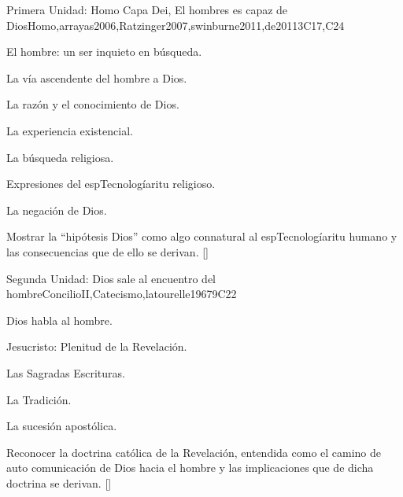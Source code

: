 \begin{syllabus}
\begin{unit}{}{Primera Unidad: Homo Capa Dei, El hombres es capaz de Dios}{Homo,arrayas2006,Ratzinger2007,swinburne2011,de2011}{3}{C17,C24}
\begin{topics}
	\item El hombre: un ser inquieto en búsqueda.
	\item La vía ascendente del hombre a Dios.
	      \begin{subtopics}
		\item La razón y el conocimiento de Dios.
		\item La experiencia existencial.
		\item La búsqueda religiosa.
	      \end{subtopics}
	\item Expresiones del espTecnologíaritu religioso.
	\item La negación de Dios.
\end{topics}
\begin{learningoutcomes}
	\item Mostrar la ``hipótesis Dios'' como algo connatural al espTecnologíaritu humano y las consecuencias que de ello se derivan. [\Familiarity]
\end{learningoutcomes}
\end{unit}

\begin{unit}{}{Segunda Unidad: Dios sale al encuentro del hombre}{ConcilioII,Catecismo,latourelle1967}{9}{C22}
\begin{topics}
	\item Dios habla al hombre.
	\item Jesucristo: Plenitud de la Revelación.
	\item Las Sagradas Escrituras.
	\item La Tradición.
	\item La sucesión apostólica.
\end{topics}
\begin{learningoutcomes}
	\item Reconocer la doctrina católica de la Revelación, entendida como el camino de auto comunicación de Dios hacia el hombre y las implicaciones que de dicha doctrina se derivan. [\Familiarity]
\end{learningoutcomes}
\end{unit}


\end{syllabus}
